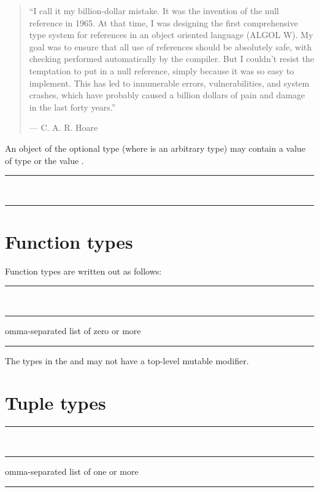 \begin{quote}
``I call it my billion-dollar mistake. It was the invention of the null
reference in 1965. At that time, I was designing the first comprehensive type
system for references in an object oriented language (ALGOL W). My goal was to
ensure that all use of references should be absolutely safe, with checking
performed automatically by the compiler. But I couldn't resist the temptation to
put in a null reference, simply because it was so easy to implement. This has
led to innumerable errors, vulnerabilities, and system crashes, which have
probably caused a billion dollars of pain and damage in the last forty years.''

--- C. A. R. Hoare
\end{quote}

An object of the optional type  (where  is an arbitrary type)
may contain a value of type  or the value .

\begin{grammar}
\rule{optional-type}  \\
\rule{wrapped-type} 
\end{grammar}

\section{Function types}

Function types are written out as follows:

\begin{grammar}
\rule{function-type} \code{(}  \code{)} \code{->} \\
\rule{parameter-type-list} comma-separated list of zero or more \\
\rule{return-type} 
\end{grammar}

The types in the  and 
may not have a top-level mutable modifier.

\section{Tuple types}

\begin{grammar}
\rule{tuple-type} \code{(}  \code{)}\\
\rule{tuple-element-list} comma-separated list of one or more \\
\rule{tuple-element}  \code{:} 
\end{grammar}

